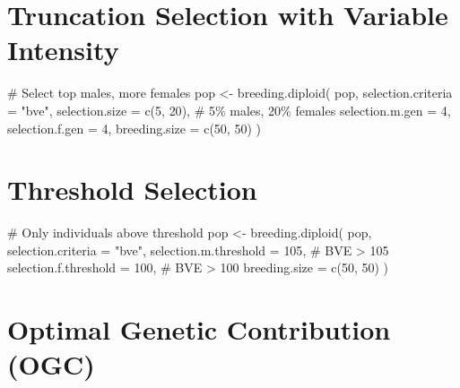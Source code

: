 \documentclass[
  letterpaper,
]{book}
\newenvironment{Shaded}{\begin{snugshade}}{\end{snugshade}}
\newcommand{\AttributeTok}[1]{\textcolor[rgb]{0.40,0.45,0.13}{#1}}
\newcommand{\CommentTok}[1]{\textcolor[rgb]{0.37,0.37,0.37}{#1}}
\newcommand{\DecValTok}[1]{\textcolor[rgb]{0.68,0.00,0.00}{#1}}
\newcommand{\FunctionTok}[1]{\textcolor[rgb]{0.28,0.35,0.67}{#1}}
\newcommand{\NormalTok}[1]{\textcolor[rgb]{0.00,0.23,0.31}{#1}}
\newcommand{\OtherTok}[1]{\textcolor[rgb]{0.00,0.23,0.31}{#1}}
\newcommand{\StringTok}[1]{\textcolor[rgb]{0.13,0.47,0.30}{#1}}
\begin{document}
\section{Truncation Selection with Variable
Intensity}\label{truncation-selection-with-variable-intensity}

\begin{Shaded}
\begin{Highlighting}[]
\CommentTok{\# Select top males, more females}
\NormalTok{pop }\OtherTok{\textless{}{-}} \FunctionTok{breeding.diploid}\NormalTok{(}
\NormalTok{  pop,}
  \AttributeTok{selection.criteria =} \StringTok{"bve"}\NormalTok{,}
  \AttributeTok{selection.size =} \FunctionTok{c}\NormalTok{(}\DecValTok{5}\NormalTok{, }\DecValTok{20}\NormalTok{),     }\CommentTok{\# 5\% males, 20\% females}
  \AttributeTok{selection.m.gen =} \DecValTok{4}\NormalTok{,}
  \AttributeTok{selection.f.gen =} \DecValTok{4}\NormalTok{,}
  \AttributeTok{breeding.size =} \FunctionTok{c}\NormalTok{(}\DecValTok{50}\NormalTok{, }\DecValTok{50}\NormalTok{)}
\NormalTok{)}
\end{Highlighting}
\end{Shaded}

\section{Threshold Selection}\label{threshold-selection}

\begin{Shaded}
\begin{Highlighting}[]
\CommentTok{\# Only individuals above threshold}
\NormalTok{pop }\OtherTok{\textless{}{-}} \FunctionTok{breeding.diploid}\NormalTok{(}
\NormalTok{  pop,}
  \AttributeTok{selection.criteria =} \StringTok{"bve"}\NormalTok{,}
  \AttributeTok{selection.m.threshold =} \DecValTok{105}\NormalTok{,   }\CommentTok{\# BVE \textgreater{} 105}
  \AttributeTok{selection.f.threshold =} \DecValTok{100}\NormalTok{,   }\CommentTok{\# BVE \textgreater{} 100}
  \AttributeTok{breeding.size =} \FunctionTok{c}\NormalTok{(}\DecValTok{50}\NormalTok{, }\DecValTok{50}\NormalTok{)}
\NormalTok{)}
\end{Highlighting}
\end{Shaded}

\section{Optimal Genetic Contribution
(OGC)}\label{optimal-genetic-contribution-ogc}
\end{document}
